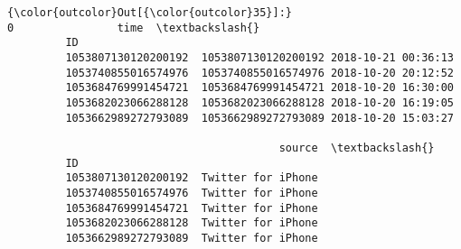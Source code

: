 \documentclass[11pt]{article}
\begin{document}
\begin{Verbatim}[commandchars=\\\{\}]
{\color{outcolor}Out[{\color{outcolor}35}]:}                                        0                time  \textbackslash{}
         ID                                                             
         1053807130120200192  1053807130120200192 2018-10-21 00:36:13   
         1053740855016574976  1053740855016574976 2018-10-20 20:12:52   
         1053684769991454721  1053684769991454721 2018-10-20 16:30:00   
         1053682023066288128  1053682023066288128 2018-10-20 16:19:05   
         1053662989272793089  1053662989272793089 2018-10-20 15:03:27   
         
                                          source  \textbackslash{}
         ID                                        
         1053807130120200192  Twitter for iPhone   
         1053740855016574976  Twitter for iPhone   
         1053684769991454721  Twitter for iPhone   
         1053682023066288128  Twitter for iPhone   
         1053662989272793089  Twitter for iPhone   
         

\end{Verbatim}
\end{document}
